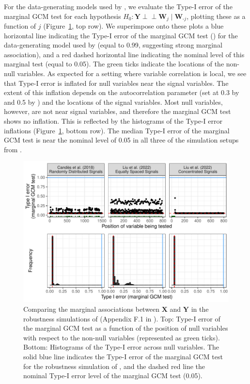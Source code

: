 \documentclass[aos]{imsart}
\theoremstyle{plain}
\theoremstyle{remark}
\newcommand{\independent}{{\perp \! \! \! \perp}}		%
\newcommand{\prx}{\bm X}								%
\newcommand{\pry}{{\bm Y}}								%
\newcommand{\nav}[1]{{\color{blue}{#1}}}
\begin{document}
For the data-generating models used by \citet{CetL16, Liu2022a}, we evaluate the Type-I error of the marginal GCM test for each hypothesis $H_0: \pry \independent \bm W_j \mid \bm W_{\text{-}j}$, plotting these as a function of $j$ (Figure~\ref{fig:evaluation_typeI_err}, top row). We superimpose onto these plots a blue horizontal line indicating the Type-I error of the marginal GCM test (\nav{fitting the intercept only model}) for the data-generating model used by \citet{Li2022} (equal to 0.99, suggesting strong marginal association), and a red dashed horizontal line indicating the nominal level of this marginal test (equal to 0.05). The green ticks indicate the locations of the non-null variables. As expected for a setting where variable correlation is local, we see that Type-I error is inflated for null variables near the signal variables. The extent of this inflation depends on the autocorrelation parameter (set at 0.3 by \cite{CetL16} and 0.5 by \cite{Liu2022a}) and the locations of the signal variables. Most null variables, however, are not near signal variables, and therefore the marginal GCM test shows no inflation. This is reflected by the histograms of the Type-I error inflations (Figure~\ref{fig:evaluation_typeI_err}, bottom row). The median Type-I error of the marginal GCM test is near the nominal level of 0.05 in all three of the simulation setups from \citet{CetL16, Liu2022a}.

\begin{figure}[!ht]
    \centering
    \includegraphics[width = \textwidth]{figures/type_I_Err_inflation_comparison.pdf}
    \caption{Comparing the marginal associations between $\prx$ and $\pry$ in the robustness simulations of \citet{CetL16, Liu2022a, Li2022} (Appendix F.1 in \cite{supplementary}). Top: Type-I error of the marginal GCM test as a function of the position of null variables with respect to the non-null variables (represented as green ticks). Bottom: Histograms of the Type-I error across null variables. The solid blue line indicates the Type-I error of the marginal GCM test for the robustness simulation of \citet{Li2022}, and the dashed red line the nominal Type-I error level of the marginal GCM test (0.05).}
    \label{fig:evaluation_typeI_err}
\end{figure}
\end{document}
